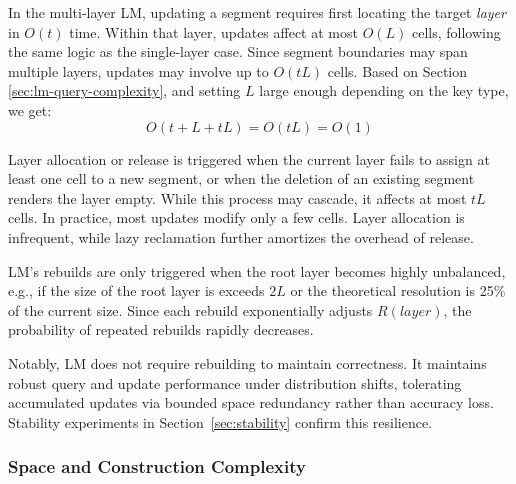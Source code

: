 
In the multi-layer LM, updating a segment requires first locating the target \textit{layer} in $O(t)$ time. Within that layer, updates affect at most $O(\mathit{L})$ cells, following the same logic as the single-layer case. Since segment boundaries may span multiple layers, updates may involve up to $O(t\mathit{L})$ cells. Based on Section \ref{sec:lm-query-complexity}, and setting $\mathit{L}$ large enough depending on the key type, we get:
$$
O(t + \mathit{L} + t\mathit{L}) = O(t\mathit{L}) = O(1)
$$


Layer allocation or release is triggered when the current layer fails to assign at least one cell to a new segment, or when the deletion of an existing segment renders the layer empty. While this process may cascade, it affects at most $t\mathit{L}$ cells. In practice, most updates modify only a few cells. Layer allocation is infrequent, while lazy reclamation further amortizes the overhead of release.

LM's rebuilds are only triggered when the root layer becomes highly unbalanced, e.g., if the size of the root layer is exceeds $2\mathit{L}$ or the theoretical resolution is 25\% of the current size. Since each rebuild exponentially adjusts $R(layer)$, the probability of repeated rebuilds rapidly decreases.

Notably, LM does not require rebuilding to maintain correctness. It maintains robust query and update performance under distribution shifts, tolerating accumulated updates via bounded space redundancy rather than accuracy loss. Stability experiments in Section~\ref{sec:stability} confirm this resilience.


\subsubsection{Space and Construction Complexity}

